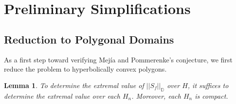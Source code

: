 \documentclass{lms}
\newcommand{\D}{\mathbb D}
\newcommand{\norm}[1]{\lvert\lvert#1\rvert\rvert}
\newtheorem{lemma}[theorem]{Lemma}
\numberwithin{equation}{section}
\begin{document}


\section{Preliminary Simplifications}\label{S:prelim}

\subsection{Reduction to Polygonal Domains}

As a first step toward verifying Mej\'ia and Pommerenke's conjecture,
we first reduce the problem to  hyperbolically convex polygons.
 
\begin{lemma} To determine the extremal value of $\norm{S_f}_\D$ over $H$,
it suffices to determine the extremal value over each $H_n$.
Moreover, each $H_n$ is compact.
\end{lemma}
\end{document}
